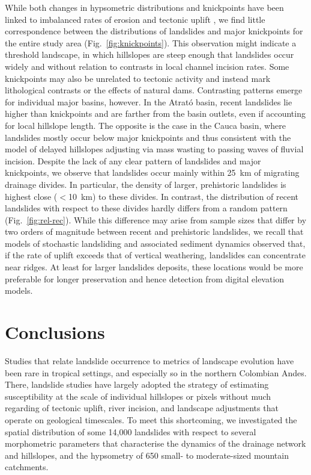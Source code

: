 \documentclass[draft]{agujournal2019}
\begin{document}
\par While both changes in hypsometric distributions and knickpoints have been linked to imbalanced rates of erosion and tectonic uplift \cite{perez-pena2009}, we find little correspondence between the distributions of landslides and major knickpoints for the entire study area (Fig.~\ref{fig:knickpoints}). This observation might indicate a threshold landscape, in which hillslopes are steep enough that landslides occur widely and without relation to contrasts in local channel incision rates. Some knickpoints may also be unrelated to tectonic activity and instead mark lithological contrasts or the effects of natural dams. Contrasting patterns emerge for individual major basins, however. In the Atrató basin, recent landslides lie higher than knickpoints and are farther from the basin outlets, even if accounting for local hillslope length. The opposite is the case in the Cauca basin, where landslides mostly occur below major knickpoints and thus consistent with the model of delayed hillslopes adjusting via mass wasting to passing waves of fluvial incision. Despite the lack of any clear pattern of landslides and major knickpoints, we observe that landslides occur mainly within 25~km of migrating drainage divides. In particular, the density of larger, prehistoric landslides is highest close ($<$10~km) to these divides. In contrast, the distribution of recent landslides with respect to these divides hardly differs from a random pattern (Fig.~\ref{fig:rel-rec}). While this difference may arise from sample sizes that differ by two orders of magnitude between recent and prehistoric landslides, we recall that models of stochastic landsliding and associated sediment dynamics \cite{Campforts2020, Campforts2022} observed that, if the rate of uplift exceeds that of vertical weathering, landslides can concentrate near ridges. At least for larger landslides deposits, these locations would be more preferable for longer preservation and hence detection from digital elevation models.

\section{Conclusions}

\par Studies that relate landslide occurrence to metrics of landscape evolution have been rare in tropical settings, and especially so in the northern Colombian Andes. There, landslide studies have largely adopted the strategy of estimating susceptibility at the scale of individual hillslopes or pixels without much regarding of tectonic uplift, river incision, and landscape adjustments that operate on geological timescales. To meet this shortcoming, we investigated the spatial distribution of some 14,000 landslides with respect to several morphometric parameters that characterise the dynamics of the drainage network and hillslopes, and the hypsometry of 650 small- to moderate-sized mountain catchments.
\end{document}
